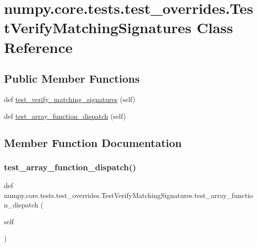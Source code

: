 \hypertarget{classnumpy_1_1core_1_1tests_1_1test__overrides_1_1TestVerifyMatchingSignatures}{}\section{numpy.\+core.\+tests.\+test\+\_\+overrides.\+Test\+Verify\+Matching\+Signatures Class Reference}
\label{classnumpy_1_1core_1_1tests_1_1test__overrides_1_1TestVerifyMatchingSignatures}
\subsection*{Public Member Functions}
\begin{DoxyCompactItemize}
\item 
def \hyperlink{classnumpy_1_1core_1_1tests_1_1test__overrides_1_1TestVerifyMatchingSignatures_aba997c6c273677260524e2cc96f55037}{test\+\_\+verify\+\_\+matching\+\_\+signatures} (self)
\item 
def \hyperlink{classnumpy_1_1core_1_1tests_1_1test__overrides_1_1TestVerifyMatchingSignatures_a678887169a9e5cc75792923454c54560}{test\+\_\+array\+\_\+function\+\_\+dispatch} (self)
\end{DoxyCompactItemize}


\subsection{Member Function Documentation}
\mbox{\label{classnumpy_1_1core_1_1tests_1_1test__overrides_1_1TestVerifyMatchingSignatures_a678887169a9e5cc75792923454c54560}} 
\subsubsection{\texorpdfstring{test\+\_\+array\+\_\+function\+\_\+dispatch()}{test\_array\_function\_dispatch()}}
{\footnotesize\ttfamily def numpy.\+core.\+tests.\+test\+\_\+overrides.\+Test\+Verify\+Matching\+Signatures.\+test\+\_\+array\+\_\+function\+\_\+dispatch (\begin{DoxyParamCaption}\item[{}]{self }\end{DoxyParamCaption})}

